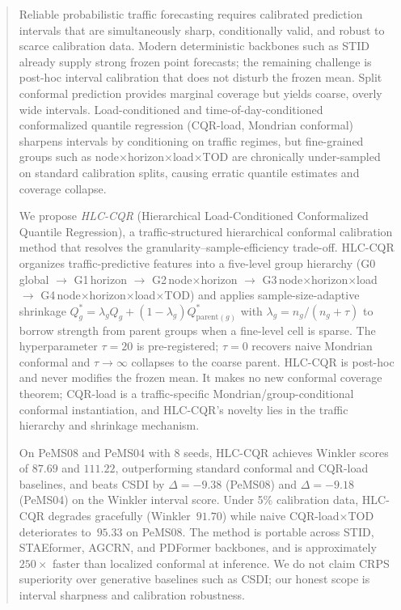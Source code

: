\documentclass[letterpaper,journal]{IEEEtran}
\begin{document}
\begin{abstract}
Reliable probabilistic traffic forecasting requires calibrated prediction
intervals that are simultaneously sharp, conditionally valid, and robust to
scarce calibration data.  Modern deterministic backbones such as STID
already supply strong frozen point forecasts; the remaining challenge is
post-hoc interval calibration that does not disturb the frozen mean.  Split
conformal prediction provides marginal coverage but yields coarse,
overly wide intervals.  Load-conditioned and time-of-day-conditioned
conformalized quantile regression (CQR-load, Mondrian conformal) sharpens
intervals by conditioning on traffic regimes, but fine-grained groups such
as node$\times$horizon$\times$load$\times$TOD are chronically under-sampled on
standard calibration splits, causing erratic quantile estimates and
coverage collapse.

We propose \emph{HLC-CQR} (Hierarchical Load-Conditioned Conformalized
Quantile Regression), a traffic-structured hierarchical conformal calibration
method that resolves the granularity--sample-efficiency trade-off.  HLC-CQR
organizes traffic-predictive features into a five-level group hierarchy
(G0\,global $\to$ G1\,horizon $\to$ G2\,node$\times$horizon $\to$
G3\,node$\times$horizon$\times$load $\to$
G4\,node$\times$horizon$\times$load$\times$TOD) and applies
sample-size-adaptive shrinkage
$Q^{*}_{g}=\lambda_{g}Q_{g}+(1-\lambda_{g})Q^{*}_{\text{parent}(g)}$
with $\lambda_{g}=n_{g}/(n_{g}+\tau)$ to borrow strength from parent
groups when a fine-level cell is sparse.  The hyperparameter $\tau=20$ is
pre-registered; $\tau=0$ recovers naive Mondrian conformal and $\tau\to\infty$
collapses to the coarse parent.  HLC-CQR is post-hoc and never modifies the
frozen mean.  It makes no new conformal coverage theorem; CQR-load is a
traffic-specific Mondrian/group-conditional conformal instantiation, and
HLC-CQR's novelty lies in the traffic hierarchy and shrinkage mechanism.

On PeMS08 and PeMS04 with 8 seeds, HLC-CQR achieves Winkler scores of
$87.69$ and $111.22$, outperforming standard conformal and CQR-load baselines,
and beats CSDI by $\Delta{=}{-9.38}$ (PeMS08) and $\Delta{=}{-9.18}$
(PeMS04) on the Winkler interval score.  Under 5\% calibration data, HLC-CQR
degrades gracefully (Winkler~$91.70$) while naive CQR-load$\times$TOD
deteriorates to~$95.33$ on PeMS08.  The method is portable across STID,
STAEformer, AGCRN, and PDFormer backbones, and is approximately $250\times$
faster than localized conformal at inference.  We do not claim CRPS
superiority over generative baselines such as CSDI; our honest scope is
interval sharpness and calibration robustness.
\end{abstract}
\end{document}
